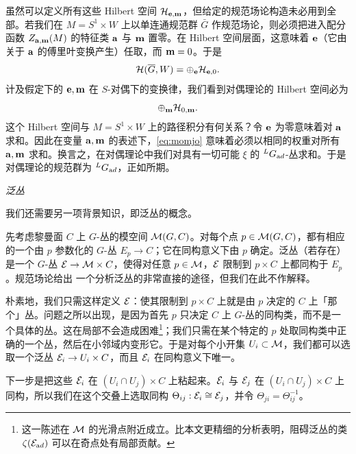 虽然可以定义所有这些 Hilbert 空间 ${\cal H}_{{\bf e},{\bf m}}$，但给定的规范场论构造未必用到全部。若我们在 $M=S^1\times W$ 上以单连通规范群 $\bar G$ 作规范场论，则必须把进入配分函数 $Z_{{\bf a},{\bf m}}(M)$ 的特征类 ${\bf a}$ 与 ${\bf m}$ 置零。在 Hilbert 空间层面，这意味着 ${\bf e}$（它由关于 ${\bf a}$ 的傅里叶变换产生）任取，而 ${\bf m}=0$。于是 %
\setcounter{equation}{9}
\begin{equation}\label{eq:ytoto}
{\cal H}(\bar G,W)=\oplus_{{\bf e}}{\cal
H}_{{\bf e},0}.
\end{equation}
计及假定下的 ${\bf e},{\bf m}$ 在 $S$-对偶下的变换律，我们看到对偶理论的 Hilbert 空间必为 %
\setcounter{equation}{10}
\begin{equation}\label{eq:momjo}
\oplus_{{\bf
m}}{\cal H}_{0,{\bf m}}.
\end{equation}
这个 Hilbert 空间与 $M=S^1\times W$ 上的路径积分有何关系？令 ${\bf e}$ 为零意味着对 ${\bf a}$ 求和。因此在变量 ${\bf a},{\bf m}$ 的表述下，\eqref{eq:momjo} 意味着必须以相同的权重对所有 ${\bf a},{\bf m}$ 求和。换言之，在对偶理论中我们对具有一切可能 $\xi$ 的 $^L\Gad$-丛求和。于是对偶理论的规范群为 $^L\Gad$，正如所期。

\par\medskip\emph{泛丛}

我们还需要另一项背景知识，即泛丛的概念。

先考虑黎曼面 $C$ 上 $G$-丛的模空间 $\M(G,C)$。对每个点 $p\in \M(G,C)$，都有相应的一个由 $p$ 参数化的 $G$-丛 $E_p\to C$；它在同构意义下由 $p$ 确定。泛丛（若存在）是一个 $G$-丛 ${\EUE} \to \M\times C$，使得对任意 $p\in \M$，${\EUE}$ 限制到 $p\times C$ 上都同构于 $E_p$。规范场论给出 \cite{ref91} 一个分析泛丛的非常直接的途径，但我们在此不作解释。

朴素地，我们只需这样定义 ${\EUE}$：使其限制到 $p\times C$ 上就是由 $p$ 决定的 $C$ 上「那个」丛。问题之所以出现，是因为首先 $p$ 只决定 $C$ 上 $G$-丛的同构类，而不是一个具体的丛。这在局部不会造成困难\footnote{这一陈述在 $\M$ 的光滑点附近成立。比本文更精细的分析表明，阻碍泛丛的类 $\zeta(\EUE_{\rm ad})$ 可以在奇点处有局部贡献。}；我们只需在某个特定的 $p$ 处取同构类中正确的一个丛，然后在小邻域内变形它。于是对每个小开集 $U_i\subset \M$，我们都可以选取一个泛丛 ${\EUE}_i\to U_i\times C$，而且 ${\EUE}_i$ 在同构意义下唯一。

下一步是把这些 ${\EUE}_i$ 在 $(U_i\cap U_j)\times C$ 上粘起来。${\EUE}_i$ 与 ${\EUE}_j$ 在 $(U_i\cap U_j)\times C$ 上同构，所以我们在这个交叠上选取同构 $\Theta_{ij}:{\EUE}_i\cong {\EUE}_j$，并令 $\Theta_{ji}=\Theta_{ij}^{-1}$。


